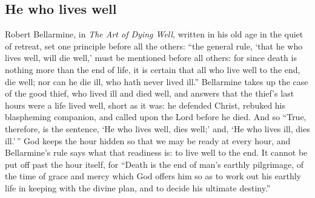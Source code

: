 \subsection{He who lives well}

Robert Bellarmine, in \emph{The Art of Dying Well}, written in his old age in the quiet of retreat, set one principle before all the others: ``the general rule, `that he who lives well, will die well,' must be mentioned before all others: for since death is nothing more than the end of life, it is certain that all who live well to the end, die well; nor can he die ill, who hath never lived ill.'' Bellarmine takes up the case of the good thief, who lived ill and died well, and answers that the thief's last hours were a life lived well, short as it was: he defended Christ, rebuked his blaspheming companion, and called upon the Lord before he died. And so ``True, therefore, is the sentence, `He who lives well, dies well;' and, `He who lives ill, dies ill.'\,'' God keeps the hour hidden so that we may be ready at every hour, and Bellarmine's rule says what that readiness is: to live well to the end. It cannot be put off past the hour itself, for ``Death is the end of man's earthly pilgrimage, of the time of grace and mercy which God offers him so as to work out his earthly life in keeping with the divine plan, and to decide his ultimate destiny.''
